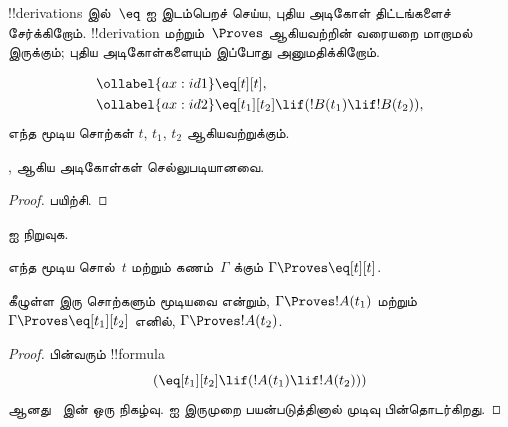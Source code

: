 \documentclass[../../../include/open-logic-section]{subfiles}
\begin{document}


!!{derivation}s இல்~$\eq$ ஐ இடம்பெறச் செய்ய, புதிய அடிகோள் திட்டங்களைச்
சேர்க்கிறோம். !!{derivation} மற்றும்~$\Proves$ ஆகியவற்றின் வரையறை மாறாமல்
இருக்கும்; புதிய அடிகோள்களையும் இப்போது அனுமதிக்கிறோம்.

\begin{defn}[!!{identity}க்கான அடிகோள்கள்]
\begin{align}
\ollabel{ax:id1} & \eq[t][t], \\
\ollabel{ax:id2} & \eq[t_1][t_2] \lif (!B(t_1) \lif
  !B(t_2)),
\end{align}
எந்த மூடிய சொற்கள் $t$, $t_1$, $t_2$ ஆகியவற்றுக்கும்.
\end{defn}

\begin{prop}
  ,  ஆகிய அடிகோள்கள் செல்லுபடியானவை.
\end{prop}

\begin{proof}
  பயிற்சி.
\end{proof}

\begin{prob}
 ஐ நிறுவுக.
\end{prob}

\begin{prop}
 எந்த மூடிய சொல்~$t$ மற்றும் கணம்~$\Gamma$ க்கும் $\Gamma \Proves \eq[t][t]$.
\end{prop}

\begin{prop}
  கீழுள்ள இரு சொற்களும் மூடியவை என்றும், $\Gamma \Proves !A(t_1)$ மற்றும் $\Gamma \Proves
  \eq[t_1][t_2]$ எனில், $\Gamma \Proves !A(t_2)$.
\end{prop}

\begin{proof}
பின்வரும் !!{formula}
\[
(\eq[t_1][t_2] \lif (!A(t_1) \lif !A(t_2)))
\]
ஆனது~ இன் ஒரு நிகழ்வு. \MP{} ஐ இருமுறை பயன்படுத்தினால்
முடிவு பின்தொடர்கிறது.
\end{proof}
\end{document}
